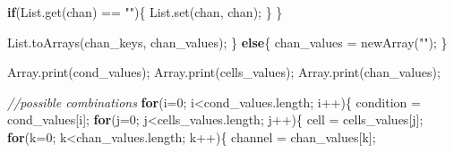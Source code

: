 \documentclass[
  12pt,
  a4paper,
]{book}
\newenvironment{Shaded}{}{}
\newcommand{\CommentTok}[1]{\textcolor[rgb]{0.38,0.63,0.69}{\textit{#1}}}
\newcommand{\ControlFlowTok}[1]{\textcolor[rgb]{0.00,0.44,0.13}{\textbf{#1}}}
\newcommand{\DecValTok}[1]{\textcolor[rgb]{0.25,0.63,0.44}{#1}}
\newcommand{\NormalTok}[1]{#1}
\newcommand{\OperatorTok}[1]{\textcolor[rgb]{0.40,0.40,0.40}{#1}}
\newcommand{\StringTok}[1]{\textcolor[rgb]{0.25,0.44,0.63}{#1}}
\begin{document}
\begin{Shaded}
\begin{Highlighting}[]
        \ControlFlowTok{if}\OperatorTok{(}\NormalTok{List}\OperatorTok{.}\NormalTok{get}\OperatorTok{(}\NormalTok{chan}\OperatorTok{)} \OperatorTok{==} \StringTok{""}\OperatorTok{)\{}
\NormalTok{            List}\OperatorTok{.}\NormalTok{set}\OperatorTok{(}\NormalTok{chan}\OperatorTok{,}\NormalTok{ chan}\OperatorTok{);}
        \OperatorTok{\}}
    \OperatorTok{\}}
    
\NormalTok{    List}\OperatorTok{.}\NormalTok{toArrays}\OperatorTok{(}\NormalTok{chan\_keys}\OperatorTok{,}\NormalTok{ chan\_values}\OperatorTok{);}
\OperatorTok{\}}
\ControlFlowTok{else}\OperatorTok{\{}
\NormalTok{    chan\_values }\OperatorTok{=}\NormalTok{ newArray}\OperatorTok{(}\StringTok{""}\OperatorTok{);}
\OperatorTok{\}}

\NormalTok{Array}\OperatorTok{.}\NormalTok{print}\OperatorTok{(}\NormalTok{cond\_values}\OperatorTok{);}
\NormalTok{Array}\OperatorTok{.}\NormalTok{print}\OperatorTok{(}\NormalTok{cells\_values}\OperatorTok{);}
\NormalTok{Array}\OperatorTok{.}\NormalTok{print}\OperatorTok{(}\NormalTok{chan\_values}\OperatorTok{);}

\CommentTok{//possible combinations}
\ControlFlowTok{for}\OperatorTok{(}\NormalTok{i}\OperatorTok{=}\DecValTok{0}\OperatorTok{;}\NormalTok{ i}\OperatorTok{\textless{}}\NormalTok{cond\_values}\OperatorTok{.}\NormalTok{length}\OperatorTok{;}\NormalTok{ i}\OperatorTok{++)\{}
\NormalTok{    condition }\OperatorTok{=}\NormalTok{ cond\_values}\OperatorTok{[}\NormalTok{i}\OperatorTok{];}
    \ControlFlowTok{for}\OperatorTok{(}\NormalTok{j}\OperatorTok{=}\DecValTok{0}\OperatorTok{;}\NormalTok{ j}\OperatorTok{\textless{}}\NormalTok{cells\_values}\OperatorTok{.}\NormalTok{length}\OperatorTok{;}\NormalTok{ j}\OperatorTok{++)\{}
\NormalTok{        cell }\OperatorTok{=}\NormalTok{ cells\_values}\OperatorTok{[}\NormalTok{j}\OperatorTok{];}
        \ControlFlowTok{for}\OperatorTok{(}\NormalTok{k}\OperatorTok{=}\DecValTok{0}\OperatorTok{;}\NormalTok{ k}\OperatorTok{\textless{}}\NormalTok{chan\_values}\OperatorTok{.}\NormalTok{length}\OperatorTok{;}\NormalTok{ k}\OperatorTok{++)\{}
\NormalTok{            channel }\OperatorTok{=}\NormalTok{ chan\_values}\OperatorTok{[}\NormalTok{k}\OperatorTok{];}


\end{Highlighting}
\end{Shaded}
\end{document}
